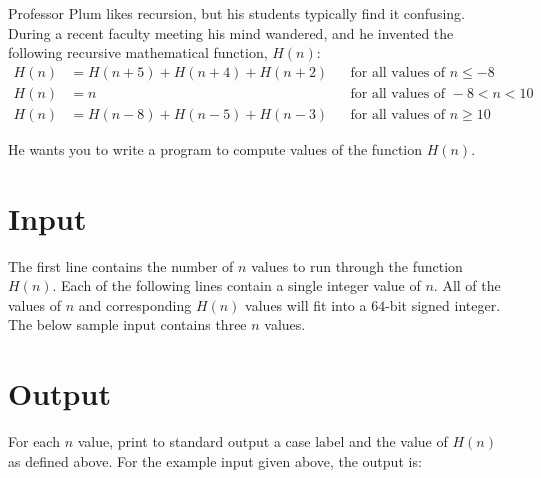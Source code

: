 
Professor Plum likes recursion, but his students typically find it confusing.  During a recent faculty meeting his mind wandered, and he invented the following recursive mathematical function, $H(n)$: \\

\begin{align*}
	H(n) &= H(n+5) + H(n+4) + H(n+2)  &&\text{for all values of } n \leq -8 \\
	H(n) &= n  &&\text{for all values of } -8 <  n < 10 \\
	H(n) &= H(n-8) + H(n-5) + H(n-3) &&\text{for all values of } n \geq 10
\end{align*}

He wants you to write a program to compute values of the function $H(n)$.

\section*{Input}
The first line contains the number of $n$ values to run through the function $H(n)$.  Each of the following lines contain a single integer value of $n$.  All of the values of $n$ and corresponding $H(n)$ values will fit into a $64$-bit signed integer. The below sample input contains three $n$ values. 

\section*{Output}
For each $n$ value, print to standard output a case label and the value of $H(n)$ as defined above. For the example input given above, the output is: